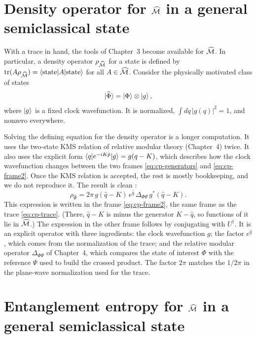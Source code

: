 \section{Density operator for \texorpdfstring{$\widehat{\mathcal{M}}$}{\^M} in a general semiclassical state}

With a trace in hand, the tools of Chapter~3 become available for $\widehat{\mathcal{M}}$. In particular, a density
operator $\rho_{\widehat{\mathcal{M}}}$ for a state is defined by $\operatorname{tr}(A\rho_{\widehat{\mathcal{M}}})=\braket{\text{state}|A|
\text{state}}$ for all $A\in\widehat{\mathcal{M}}$. Consider the physically motivated class of states
\begin{equation}
\ket{\widehat\Phi}=\ket\Phi\otimes\ket g ,
\label{eq:cp-semiclassical}
\end{equation}
where $\ket g$ is a fixed clock wavefunction. It is normalized, $\int dq\,|g(q)|^2=1$, and nonzero everywhere.

Solving the defining equation for the density operator is a longer computation. It uses the two-state KMS
relation of relative modular theory (Chapter~4) twice. It also uses the explicit form
$\braket{q|e^{-iK\hat p}|g}=g(q-K)$, which describes how the clock wavefunction changes between the two frames
\eqref{eq:cp-generators} and \eqref{eq:cp-frame2}. Once the KMS relation is accepted, the rest is mostly
bookkeeping, and we do not reproduce it. The result is clean \cite{CLPW}:
\begin{equation}
\rho_{\widehat\Phi} = 2\pi\, g(\hat q-K)\,e^{\hat q}\,\Delta_{\Phi\Psi}\, g^*(\hat q-K) .
\label{eq:cp-density}
\end{equation}
This expression is written in the frame \eqref{eq:cp-frame2}, the same frame as the trace
\eqref{eq:cp-trace}. (There, $\hat q-K$ is minus the generator $K-\hat q$, so functions of it lie in
$\widehat{\mathcal{M}}$.) The expression in the other frame follows by conjugating with $U^\dagger$. It is an explicit
operator with three ingredients: the clock wavefunction $g$; the factor $e^{\hat q}$, which comes from the
normalization of the trace; and the relative modular operator $\Delta_{\Phi\Psi}$ of Chapter~4, which compares
the state of interest $\Phi$ with the reference $\Psi$ used to build the crossed product. The factor $2\pi$
matches the $1/2\pi$ in the plane-wave normalization used for the trace.

\section{Entanglement entropy for \texorpdfstring{$\widehat{\mathcal{M}}$}{\^M} in a general semiclassical state}

